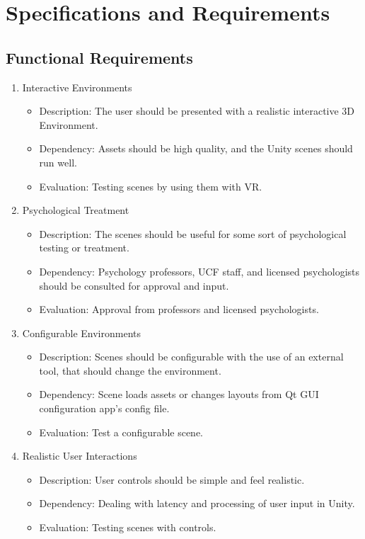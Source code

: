 \documentclass[a4paper,10pt]{article}
\begin{document}
\section{Specifications and Requirements}
	\subsection{Functional Requirements}
	\begin{enumerate}
		\item Interactive Environments
		\begin{itemize}
		\item Description: The user should be presented with a realistic interactive 3D Environment. 
		\item Dependency: Assets should be high quality, and the Unity scenes should run well.
		\item Evaluation: Testing scenes by using them with VR.
		\end{itemize}
		\item Psychological Treatment
		\begin{itemize}
		\item Description: The scenes should be useful for some sort of psychological testing or treatment.
		\item Dependency:  Psychology professors, UCF staff, and licensed psychologists should be consulted for approval and input.
		\item Evaluation:  Approval from professors and licensed psychologists. 
		\end{itemize}
		\item Configurable Environments
		\begin{itemize} 
		\item Description: Scenes should be configurable with the use of an external tool, that should change the environment. 
		\item Dependency:  Scene loads assets or changes layouts from Qt GUI configuration app's config file. 
		\item Evaluation:  Test a configurable scene.
		\end{itemize}
		\item Realistic User Interactions
		\begin{itemize}
		\item Description: User controls should be simple and feel realistic. 
		\item Dependency:  Dealing with latency and processing of user input in Unity. 
		\item Evaluation:  Testing scenes with controls.

\end{itemize}
\end{enumerate}
\end{document}
